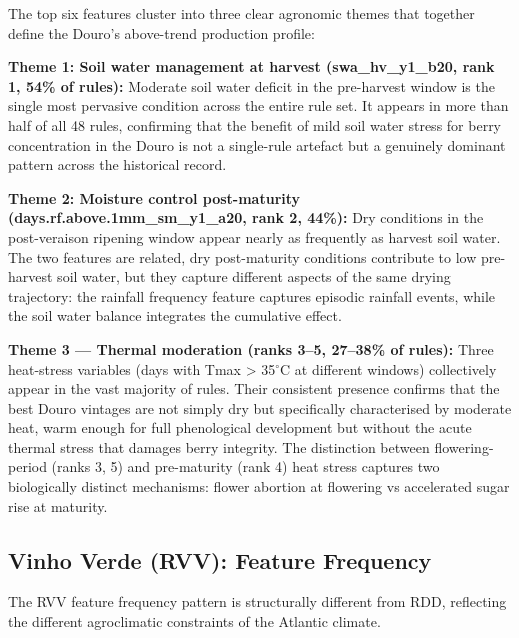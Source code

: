The top six features cluster into three clear agronomic themes that together define the Douro's above-trend production profile:

\textbf{Theme 1: Soil water management at harvest (swa\_hv\_y1\_b20, rank 1, 54\% of rules): }Moderate soil water deficit in the pre-harvest window is the single most pervasive condition across the entire rule set. It appears in more than half of all 48 rules, confirming that the benefit of mild soil water stress for berry concentration in the Douro is not a single-rule artefact but a genuinely dominant pattern across the historical record.

\textbf{Theme 2: Moisture control post-maturity (days.rf.above.1mm\_sm\_y1\_a20, rank 2, 44\%): }Dry conditions in the post-veraison ripening window appear nearly as frequently as harvest soil water. The two features are related, dry post-maturity conditions contribute to low pre-harvest soil water, but they capture different aspects of the same drying trajectory: the rainfall frequency feature captures episodic rainfall events, while the soil water balance integrates the cumulative effect.

\textbf{Theme 3 --- Thermal moderation (ranks 3--5, 27--38\% of rules): }Three heat-stress variables (days with Tmax > 35$^\circ$C at different windows) collectively appear in the vast majority of rules. Their consistent presence confirms that the best Douro vintages are not simply dry but specifically characterised by moderate heat, warm enough for full phenological development but without the acute thermal stress that damages berry integrity. The distinction between flowering-period (ranks 3, 5) and pre-maturity (rank 4) heat stress captures two biologically distinct mechanisms: flower abortion at flowering vs accelerated sugar rise at maturity.


\subsection{Vinho Verde (RVV): Feature Frequency}\label{sub:vinho_verde_rvv_feature}

The RVV feature frequency pattern is structurally different from RDD, reflecting the different agroclimatic constraints of the Atlantic climate.

